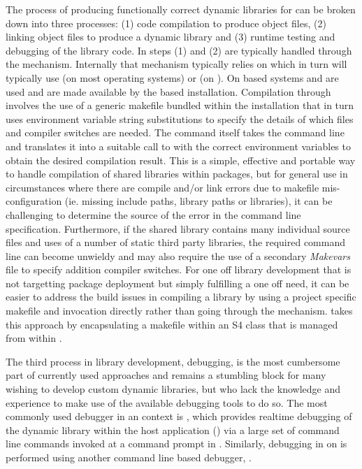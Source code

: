 The process of producing functionally correct dynamic libraries for  can be broken down into three processes: (1) code compilation to produce object files,
(2) linking object files to produce a dynamic library and (3) runtime testing and debugging of the library code. In  steps (1) and (2) 
are typically handled through the \citep{SHLIB} mechanism. Internally that mechanism typically relies on \citep{GnuMake} which 
in turn will typically use \citep{gcc} (on most operating systems) or \citep{LLVM} (on ). On  based systems  and 
are used and are made available by the  based  installation\citep{UsingRtools}. Compilation through  
involves the use of a generic makefile bundled within the  installation that in turn uses environment variable string substitutions to specify the details 
of which files and compiler switches are needed. The command itself takes the command line and translates it into a suitable call to  with the correct 
environment variables to obtain the desired compilation result. This is a simple, effective and portable way to handle compilation of shared 
libraries within  packages, but for general use in circumstances where there are compile and/or link errors due to makefile mis-configuration 
(ie. missing include paths, library paths or libraries), it can be challenging to determine the source of the error in the command line specification. Furthermore, 
if the shared library contains many individual source files and uses of a number of static third party libraries, the required command line can become 
unwieldy and may also require the use of a secondary \emph{Makevars} file to specify addition compiler switches. For one off library development that is not targetting
package deployment but simply fulfilling a one off need, it can be easier to address the build issues in compiling a library by using a project specific makefile 
and  invocation directly rather than going through the  mechanism.  takes this approach by encapsulating a makefile within 
an S4 class that is managed from within .

The third process in library development, debugging, is the most cumbersome part of currently used approaches and remains a stumbling 
block for many wishing to develop custom dynamic libraries, but who lack the knowledge and experience to make use of the available debugging 
tools to do so. The most commonly used debugger in an  context is \citep{GDB}, which provides realtime debugging of the dynamic library within the
host application () via a large set of command line commands invoked at a command prompt in . Similarly, debugging in  on  is performed using another 
command line based debugger, \citep{LLDB}. 

